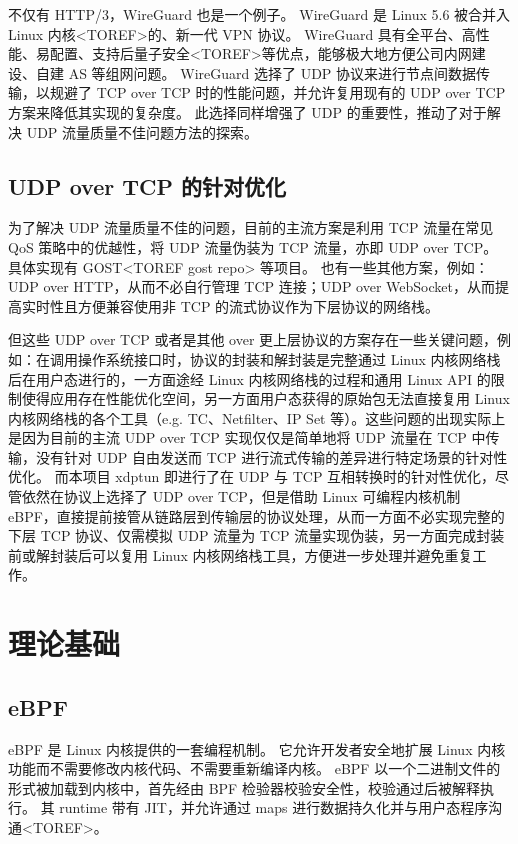 不仅有 HTTP/3，WireGuard 也是一个例子。
WireGuard 是 Linux 5.6 被合并入 Linux 内核<TOREF>的、新一代 VPN 协议。
WireGuard 具有全平台、高性能、易配置、支持后量子安全<TOREF>等优点，能够极大地方便公司内网建设、自建 AS 等组网问题。
WireGuard 选择了 UDP 协议来进行节点间数据传输，以规避了 TCP over TCP 时的性能问题，并允许复用现有的 UDP over TCP 方案来降低其实现的复杂度。
此选择同样增强了 UDP 的重要性，推动了对于解决 UDP 流量质量不佳问题方法的探索。

\section{UDP over TCP 的针对优化}

为了解决 UDP 流量质量不佳的问题，目前的主流方案是利用 TCP 流量在常见 QoS 策略中的优越性，将 UDP 流量伪装为 TCP 流量，亦即 UDP over TCP。
具体实现有 GOST<TOREF gost repo> 等项目。
也有一些其他方案，例如：UDP over HTTP，从而不必自行管理 TCP 连接；UDP over WebSocket，从而提高实时性且方便兼容使用非 TCP 的流式协议作为下层协议的网络栈。

但这些 UDP over TCP 或者是其他 over 更上层协议的方案存在一些关键问题，例如：在调用操作系统接口时，协议的封装和解封装是完整通过 Linux 内核网络栈后在用户态进行的，一方面途经 Linux 内核网络栈的过程和通用 Linux API 的限制使得应用存在性能优化空间，另一方面用户态获得的原始包无法直接复用 Linux 内核网络栈的各个工具（e.g. TC、Netfilter、IP Set 等）。这些问题的出现实际上是因为目前的主流 UDP over TCP 实现仅仅是简单地将 UDP 流量在 TCP 中传输，没有针对 UDP 自由发送而 TCP 进行流式传输的差异进行特定场景的针对性优化。
而本项目 xdptun 即进行了在 UDP 与 TCP 互相转换时的针对性优化，尽管依然在协议上选择了 UDP over TCP，但是借助 Linux 可编程内核机制 eBPF，直接提前接管从链路层到传输层的协议处理，从而一方面不必实现完整的下层 TCP 协议、仅需模拟 UDP 流量为 TCP 流量实现伪装，另一方面完成封装前或解封装后可以复用 Linux 内核网络栈工具，方便进一步处理并避免重复工作。

\chapter{理论基础}

\section{eBPF}

eBPF 是 Linux 内核提供的一套编程机制。
它允许开发者安全地扩展 Linux 内核功能而不需要修改内核代码、不需要重新编译内核。
eBPF 以一个二进制文件的形式被加载到内核中，首先经由 BPF 检验器校验安全性，校验通过后被解释执行。
其 runtime 带有 JIT，并允许通过 maps 进行数据持久化并与用户态程序沟通<TOREF>。

